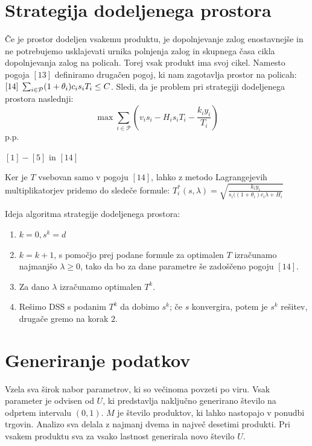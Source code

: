 \documentclass[a4paper]{article}
\begin{document}
\pagebreak
\section{Strategija dodeljenega prostora}

Če je prostor dodeljen vsakemu produktu, je dopolnjevanje zalog enostavnejše in ne potrebujemo usklajevati urnika polnjenja zalog in skupnega časa cikla dopolnjevanja zalog na policah. Torej vsak produkt ima svoj cikel. Namesto pogoja $[13]$ definiramo drugačen pogoj, ki nam zagotavlja prostor na policah: $[14]\hspace*{1 mm} \sum_{i \in \mathcal{P}} (1 + \theta_i) c_i s_i T_i \leq C$. Sledi, da je problem pri strategiji dodeljenega prostora naslednji:
$$ \max  \sum_{i \in \mathcal{P}} ( v_i s_ i - H_i  s_i T_i - \frac{k_i y_i}{T_i})  $$
p.p.

$[1] - [5]$ in $[14]$

\vspace*{1 mm}
Ker je $T$ vsebovan samo v pogoju $[14]$, lahko z metodo Lagrangejevih multiplikatorjev pridemo do sledeče formule:
$T^*_i(s, \lambda) = \sqrt{\frac{k_i y_i}{s_i ((1+\theta_i)c_i\lambda + H_i}}$

Ideja algoritma strategije dodeljenega prostora:
\begin{enumerate}
\item $k = 0, s^k = d$
\item $k = k + 1$, s pomočjo prej podane formule  za optimalen $T$ izračunamo najmanjšo $\lambda \geq 0$, tako da bo za dane parametre še zadoščeno pogoju $[14]$.
\item Za dano $\lambda$ izračunamo optimalen $T^k$.
\item Rešimo DSS s podanim $T^k$ da dobimo $s^k$; če $s$ konvergira, potem je $s^k$ rešitev, drugače gremo na korak $2$.
\end{enumerate}

\section{Generiranje podatkov}


Vzela sva širok nabor parametrov, ki so večinoma povzeti po viru. Vsak parameter je odvisen od $U$, ki predstavlja naključno generirano število na odprtem intervalu $(0,1)$. $M$ je število produktov, ki lahko nastopajo v ponudbi trgovin. Analizo sva delala z najmanj dvema in največ desetimi produkti. Pri vsakem produktu sva za vsako lastnost generirala novo število $U$.
\end{document}
